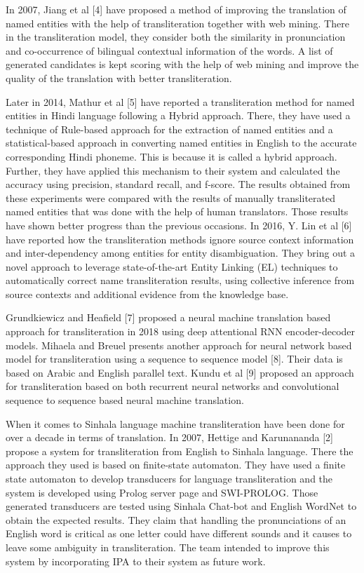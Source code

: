 \documentclass[10pt, a4paper, conference, compsocconf]{IEEEtran}
\begin{document}
In 2007, Jiang et al [4] have proposed a method of improving the translation of named entities with the help of transliteration together with web mining. There in the transliteration model, they consider both the similarity in pronunciation and co-occurrence of bilingual contextual information of the words. A list of generated candidates is kept scoring with the help of web mining and improve the quality of the translation with better transliteration.

Later in 2014, Mathur et al [5] have reported a transliteration method for named entities in Hindi language following a Hybrid approach. There, they have used a technique of Rule-based approach for the extraction of named entities and a statistical-based approach in converting named entities in English to the accurate corresponding Hindi phoneme. This is because it is called a hybrid approach. Further, they have applied this mechanism to their system and calculated the accuracy using precision, standard recall, and f-score. The results obtained from these experiments were compared with the results of manually transliterated named entities that was done with the help of human translators. Those results have shown better progress than the previous occasions. In 2016, Y. Lin et al [6] have reported how the transliteration methods ignore source context information and inter-dependency among entities for entity disambiguation. They bring out a novel approach to leverage state-of-the-art Entity Linking (EL) techniques to automatically correct name transliteration results, using collective inference from source contexts and additional evidence from the knowledge base. 

Grundkiewicz and Heafield [7] proposed a neural machine translation based approach for transliteration in 2018 using deep attentional RNN encoder-decoder models. Mihaela and Breuel presents another approach for neural network based model for transliteration using a sequence to sequence model [8]. Their data is based on Arabic and English parallel text. Kundu et al [9] proposed an approach for transliteration based on both recurrent neural networks and convolutional sequence to sequence based neural machine translation.

When it comes to Sinhala language machine transliteration have been done for over a decade in terms of translation. In 2007, Hettige and Karunananda [2] propose a system for transliteration from English to Sinhala language. There the approach they used is based on finite-state automaton. They have used a finite state automaton to develop transducers for language transliteration and the system is developed using Prolog server page and SWI-PROLOG. Those generated transducers are tested using Sinhala Chat-bot and English WordNet to obtain the expected results. They claim that handling the pronunciations of an English word is critical as one letter could have different sounds and it causes to leave some ambiguity in transliteration. The team intended to improve this system by incorporating IPA to their system as future work.
\end{document}
